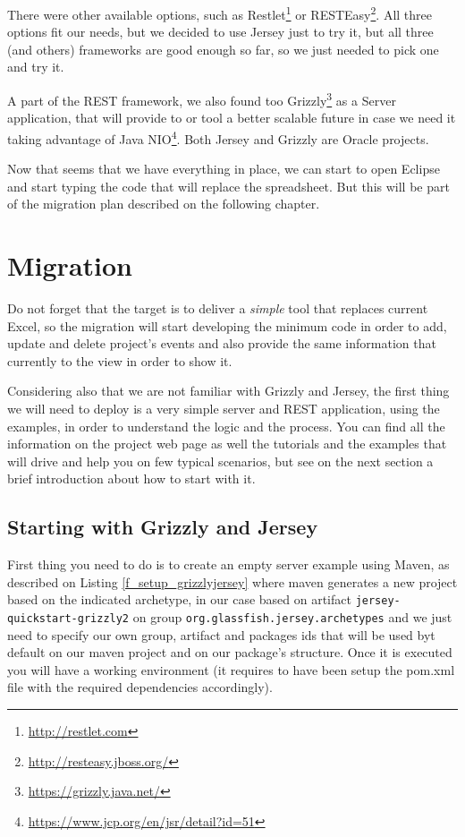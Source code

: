 There were other available options, such as
Restlet\footnote{\url{http://restlet.com}} or
RESTEasy\footnote{\url{http://resteasy.jboss.org/}}. All three options fit our
needs, but we decided to use Jersey just to try it, but all three (and others)
frameworks are good enough so far, so we just needed to pick one and try it.

A part of the REST framework, we also found too Grizzly\footnote{\url{https://grizzly.java.net/}} as a Server application, that will
provide to or tool a better scalable future in case we need it taking
advantage of Java NIO\footnote{\url{https://www.jcp.org/en/jsr/detail?id=51}}.
Both Jersey and Grizzly are Oracle projects.

Now that seems that we have everything in place, we can start to open Eclipse
and start typing the code that will replace the spreadsheet. But this will be
part of the migration plan described on the following chapter.

\chapter{Migration}
Do not forget that the target is to deliver a \emph{simple} tool that replaces
current Excel, so the migration will start developing the minimum code in order
to add, update and delete project's events and also provide the same
information that currently to the view in order to show it.

Considering also that we are not familiar with Grizzly and Jersey, the first
thing we will need to deploy is a very simple server and REST application,
using the examples, in order to understand the logic and the process. You can find all the
information on the project web page as well the tutorials and the examples that
will drive and help you on few typical scenarios, but see on the next section a
brief introduction about how to start with it.

\section{Starting with Grizzly and Jersey}
First thing you need to do is to create an empty server example using Maven,
as described on Listing \ref{f_setup_grizzlyjersey} where maven generates a new
project based on the indicated archetype, in our case based on artifact
\texttt{jersey-quickstart-grizzly2} on group
\texttt{org.glassfish.jersey.archetypes} and we just need to specify our own
group, artifact and packages ids that will be used byt default on our maven
project and on our package's structure. Once it is executed you will have a
working environment (it requires to have been setup the pom.xml file with the required dependencies accordingly).\\

